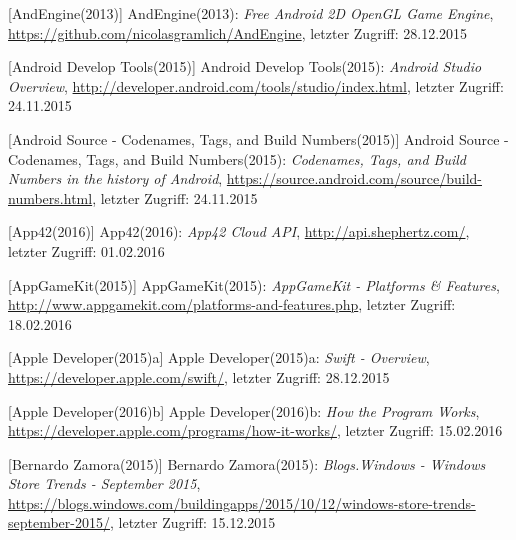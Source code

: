 
\listoffigures %
\listoftables %

\begin{thebibliography}{}
	
[AndEngine(2013)] AndEngine(2013): \emph{Free Android 2D OpenGL Game Engine},
\url{https://github.com/nicolasgramlich/AndEngine}, letzter Zugriff: 28.12.2015

[Android Develop Tools(2015)] Android Develop Tools(2015): \emph{Android Studio Overview},
\url{http://developer.android.com/tools/studio/index.html}, letzter Zugriff: 24.11.2015

[Android Source - Codenames, Tags, and Build Numbers(2015)] Android Source - Codenames, Tags, and Build Numbers(2015):
\emph{Codenames, Tags, and Build Numbers in the history of Android},
\url{https://source.android.com/source/build-numbers.html}, letzter Zugriff: 24.11.2015

[App42(2016)] App42(2016): \emph{App42 Cloud API},
\url{http://api.shephertz.com/}, letzter Zugriff: 01.02.2016

[AppGameKit(2015)] AppGameKit(2015): \emph{AppGameKit - Platforms \& Features},
\url{http://www.appgamekit.com/platforms-and-features.php}, letzter Zugriff: 18.02.2016

[Apple Developer(2015)a] Apple Developer(2015)a: \emph{Swift - Overview},
\url{https://developer.apple.com/swift/}, letzter Zugriff: 28.12.2015

[Apple Developer(2016)b] Apple Developer(2016)b: \emph{How the Program Works},
\url{https://developer.apple.com/programs/how-it-works/}, letzter Zugriff: 15.02.2016

[Bernardo Zamora(2015)] Bernardo Zamora(2015): \emph{Blogs.Windows - Windows Store Trends - September 2015},
\url{https://blogs.windows.com/buildingapps/2015/10/12/windows-store-trends-september-2015/}, letzter Zugriff: 15.12.2015


\end{thebibliography}
